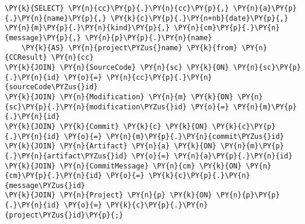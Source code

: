 \begin{Verbatim}[commandchars=\\\{\}]
\PY{k}{SELECT} \PY{n}{cc}\PY{p}{.}\PY{n}{cc}\PY{p}{,} \PY{n}{a}\PY{p}{.}\PY{n}{name}\PY{p}{,} \PY{k}{c}\PY{p}{.}\PY{n+nb}{date}\PY{p}{,} \PY{n}{m}\PY{p}{.}\PY{n}{kind}\PY{p}{,} \PY{n}{cm}\PY{p}{.}\PY{n}{message}\PY{p}{,} \PY{n}{p}\PY{p}{.}\PY{n}{name} 
	\PY{k}{AS} \PY{n}{project\PYZus{}name} \PY{k}{from} \PY{n}{CCResult} \PY{n}{cc}
\PY{k}{JOIN} \PY{n}{SourceCode} \PY{n}{sc} \PY{k}{ON} \PY{n}{sc}\PY{p}{.}\PY{n}{id} \PY{o}{=} \PY{n}{cc}\PY{p}{.}\PY{n}{sourceCode\PYZus{}id} 
\PY{k}{JOIN} \PY{n}{Modification} \PY{n}{m} \PY{k}{ON} \PY{n}{sc}\PY{p}{.}\PY{n}{modification\PYZus{}id} \PY{o}{=} \PY{n}{m}\PY{p}{.}\PY{n}{id}  
\PY{k}{JOIN} \PY{k}{Commit} \PY{k}{c} \PY{k}{ON} \PY{k}{c}\PY{p}{.}\PY{n}{id} \PY{o}{=} \PY{n}{m}\PY{p}{.}\PY{n}{commit\PYZus{}id} 
\PY{k}{JOIN} \PY{n}{Artifact} \PY{n}{a} \PY{k}{ON} \PY{n}{m}\PY{p}{.}\PY{n}{artifact\PYZus{}id} \PY{o}{=} \PY{n}{a}\PY{p}{.}\PY{n}{id}  
\PY{k}{JOIN} \PY{n}{CommitMessage} \PY{n}{cm} \PY{k}{ON} \PY{n}{cm}\PY{p}{.}\PY{n}{id} \PY{o}{=} \PY{k}{c}\PY{p}{.}\PY{n}{message\PYZus{}id} 
\PY{k}{JOIN} \PY{n}{Project} \PY{n}{p} \PY{k}{ON} \PY{n}{p}\PY{p}{.}\PY{n}{id} \PY{o}{=} \PY{k}{c}\PY{p}{.}\PY{n}{project\PYZus{}id}\PY{p}{;}
\end{Verbatim}
